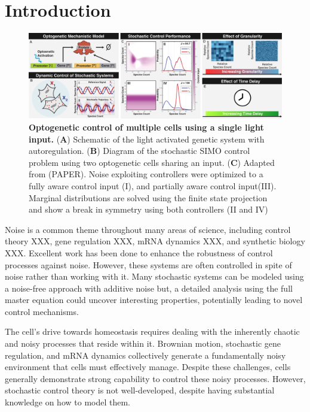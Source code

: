 \documentclass[12pt]{article}
\begin{document}
\section{Introduction}
\begin{figure}
\begin{center}
\includegraphics[width=\columnwidth]{Cartoons.pdf}
\caption{{\bf Optogenetic control of multiple cells using a single light input.}
({\bf A}) Schematic of the light activated genetic system with autoregulation.
({\bf B}) Diagram of the stochastic SIMO control problem using two optogenetic cells sharing an input.
({\bf C}) Adapted from (PAPER). Noise exploiting controllers were optimized to a fully aware control input (I), and partially aware control input(III). Marginal distributions are solved using the finite state projection and show a break in symmetry using both controllers (II and IV) }
\label{cartoons}
\end{center}
\vspace{-0.3in}
\end{figure}

Noise is a common theme throughout many areas of science, including control theory XXX, gene regulation XXX, mRNA dynamics XXX, and synthetic biology XXX. Excellent work has been done to enhance the robustness of control processes against noise. However, these systems are often controlled in spite of noise rather than working with it. Many stochastic systems can be modeled using a noise-free approach with additive noise but, a detailed analysis using the full master equation could uncover interesting properties, potentially leading to novel control mechanisms.

The cell's drive towards homeostasis requires dealing with the inherently chaotic and noisy processes that reside within it. Brownian motion, stochastic gene regulation, and mRNA dynamics collectively generate a fundamentally noisy environment that cells must effectively manage. Despite these challenges, cells generally demonstrate strong capability to control these noisy processes. However, stochastic control theory is not well-developed, despite having substantial knowledge on how to model them.
\end{document}
